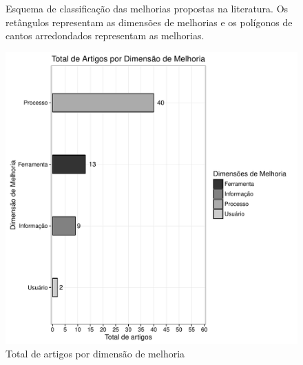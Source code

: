 \begin{figure}[tb]
\centering
\caption{Esquema de classificação das melhorias propostas na literatura. Os
	retângulos representam as dimensões de melhorias e os polígonos de cantos
	arredondados representam as melhorias.}
\label{fig:diagrama-esquema-dimensao-melhorias}
\end{figure}

\begin{figure}[htpb]
	\centering
	\includegraphics[width=0.9\linewidth]{./chapter-mapeamento-sistematico/img/grafico_dim_melhoria_por_artigo.pdf}
	\caption{Total de artigos por dimensão de melhoria}
\label{fig:grafico_dim_melhoria_por_artigo}
\end{figure}

